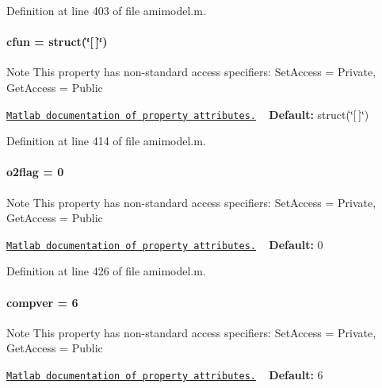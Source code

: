 Definition at line 403 of file amimodel.\+m.

\hypertarget{classamimodel_afec809c626a350367485aa6aaea6b585}{}
\paragraph[{cfun}]{\setlength{\rightskip}{0pt plus 5cm}cfun = struct(\char`\"{}\mbox{[}$\,$\mbox{]}\char`\"{})}\label{classamimodel_afec809c626a350367485aa6aaea6b585}
\begin{DoxyNote}{Note}
This property has non-\/standard access specifiers\+: {\ttfamily Set\+Access = Private, Get\+Access = Public} 

\href{http://www.mathworks.com/help/matlab/matlab_oop/property-attributes.html}{\tt Matlab documentation of property attributes.} ~\newline
{\bfseries Default\+:} struct(\char`\"{}\mbox{[}$\,$\mbox{]}\char`\"{}) 
\end{DoxyNote}


Definition at line 414 of file amimodel.\+m.

\hypertarget{classamimodel_a2b89e3b4e249878a2d436ee337952c4f}{}
\paragraph[{o2flag}]{\setlength{\rightskip}{0pt plus 5cm}o2flag = 0}\label{classamimodel_a2b89e3b4e249878a2d436ee337952c4f}
\begin{DoxyNote}{Note}
This property has non-\/standard access specifiers\+: {\ttfamily Set\+Access = Private, Get\+Access = Public} 

\href{http://www.mathworks.com/help/matlab/matlab_oop/property-attributes.html}{\tt Matlab documentation of property attributes.} ~\newline
{\bfseries Default\+:} 0 
\end{DoxyNote}


Definition at line 426 of file amimodel.\+m.

\hypertarget{classamimodel_a0a9e4caf628a02e6db68e91c2de6f382}{}
\paragraph[{compver}]{\setlength{\rightskip}{0pt plus 5cm}compver = 6}\label{classamimodel_a0a9e4caf628a02e6db68e91c2de6f382}
\begin{DoxyNote}{Note}
This property has non-\/standard access specifiers\+: {\ttfamily Set\+Access = Private, Get\+Access = Public} 

\href{http://www.mathworks.com/help/matlab/matlab_oop/property-attributes.html}{\tt Matlab documentation of property attributes.} ~\newline
{\bfseries Default\+:} 6 
\end{DoxyNote}


